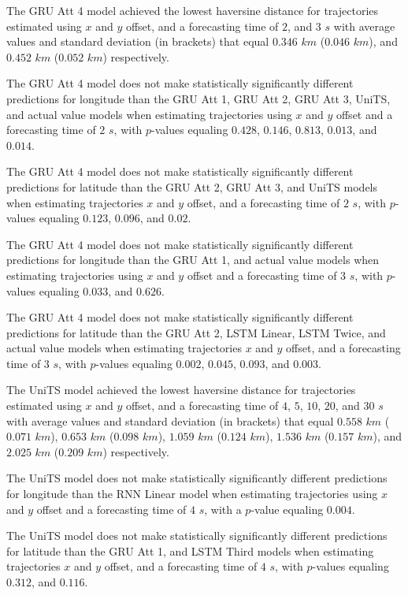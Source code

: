The GRU Att 4 model achieved the lowest haversine distance for trajectories estimated using $x$ and $y$ offset, and a forecasting time of $2$, and $3$ $s$ with average values and standard deviation (in brackets) that equal $0.346$ $km$ ($0.046$ $km$), and $0.452$ $km$ ($0.052$ $km$) respectively.

The GRU Att 4 model does not make statistically significantly different predictions for longitude than the GRU Att 1, GRU Att 2, GRU Att 3, UniTS, and actual value models when estimating trajectories using $x$ and $y$ offset and a forecasting time of $2$ $s$, with $p$-values equaling $0.428$, $0.146$, $0.813$, $0.013$, and $0.014$.

The GRU Att 4 model does not make statistically significantly different predictions for latitude than the GRU Att 2, GRU Att 3, and UniTS models when estimating trajectories $x$ and $y$ offset, and a forecasting time of $2$ $s$, with $p$-values equaling $0.123$, $0.096$, and $0.02$.

The GRU Att 4 model does not make statistically significantly different predictions for longitude than the GRU Att 1, and actual value models when estimating trajectories using $x$ and $y$ offset and a forecasting time of $3$ $s$, with $p$-values equaling $0.033$, and $0.626$.

The GRU Att 4 model does not make statistically significantly different predictions for latitude than the GRU Att 2, LSTM Linear, LSTM Twice, and actual value models when estimating trajectories $x$ and $y$ offset, and a forecasting time of $3$ $s$, with $p$-values equaling $0.002$, $0.045$, $0.093$, and $0.003$.

The UniTS model achieved the lowest haversine distance for trajectories estimated using $x$ and $y$ offset, and a forecasting time of $4$, $5$, $10$, $20$, and $30$ $s$ with average values and standard deviation (in brackets) that equal $0.558$ $km$ ($0.071$ $km$), $0.653$ $km$ ($0.098$ $km$), $1.059$ $km$ ($0.124$ $km$), $1.536$ $km$ ($0.157$ $km$), and $2.025$ $km$ ($0.209$ $km$) respectively.

The UniTS model does not make statistically significantly different predictions for longitude than the RNN Linear model when estimating trajectories using $x$ and $y$ offset and a forecasting time of $4$ $s$, with a $p$-value equaling $0.004$.

The UniTS model does not make statistically significantly different predictions for latitude than the GRU Att 1, and LSTM Third models when estimating trajectories $x$ and $y$ offset, and a forecasting time of $4$ $s$, with $p$-values equaling $0.312$, and $0.116$.


